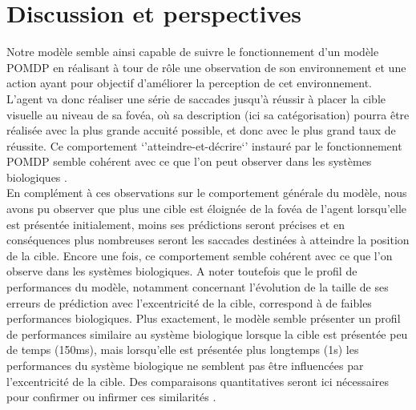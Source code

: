 
\chapter{Discussion et perspectives} %

\label{Discussion} %

Notre modèle semble ainsi capable de suivre le fonctionnement d'un modèle POMDP en réalisant à tour de rôle une observation de son environnement et une action ayant pour objectif d'améliorer la perception de cet environnement. \\
L'agent va donc réaliser une série de saccades jusqu'à réussir à placer la cible visuelle au niveau de sa fovéa, où sa description (ici sa catégorisation) pourra être réalisée avec la plus grande accuité possible, et donc avec le plus grand taux de réussite. Ce comportement `'atteindre-et-décrire`' instauré par le fonctionnement POMDP semble cohérent avec ce que l'on peut observer dans les systèmes biologiques \autocite{Werner2014, Najemnik2005}. \\
En complément à ces observations sur le comportement générale du modèle, nous avons pu observer que plus une cible est éloignée de la fovéa de l'agent lorsqu'elle est présentée initialement, moins ses prédictions seront précises et en conséquences plus nombreuses seront les saccades destinées à atteindre la position de la cible. 
Encore une fois, ce comportement semble cohérent avec ce que l'on observe dans les systèmes biologiques. 
A noter toutefois que le profil de performances du modèle, notamment concernant l'évolution de la taille de ses erreurs de prédiction avec l'excentricité de la cible, correspond à de faibles performances biologiques. 
Plus exactement, le modèle semble présenter un profil de performances similaire au système biologique lorsque la cible est présentée peu de temps (150ms), mais lorsqu'elle est présentée plus longtemps (1s) les performances du système biologique ne semblent pas être influencées par l'excentricité de la cible. Des comparaisons quantitatives seront ici nécessaires pour confirmer ou infirmer ces similarités \autocite{Uddin2004}.\\

	
